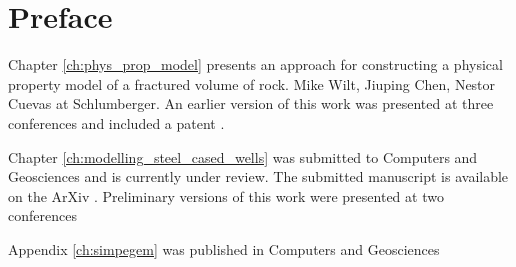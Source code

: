 
\chapter{Preface}

Chapter \ref{ch:phys_prop_model} presents an approach for constructing a physical property
model of a fractured volume of rock.
Mike Wilt, Jiuping Chen, Nestor Cuevas at Schlumberger.
An earlier version of this work was presented at three conferences
\cite{Heagy2013, Heagy2014, Wilt2014} and included a patent \cite{Wilt2015}.

Chapter \ref{ch:modelling_steel_cased_wells} was submitted to Computers and Geosciences and is currently under review.
The submitted manuscript is available on the ArXiv \cite{}.
Preliminary versions of this work were presented at two conferences \cite{Heagy2015, Heagy2017a}


Appendix \ref{ch:simpegem} was published in Computers and Geosciences \citep{Heagy2017}
